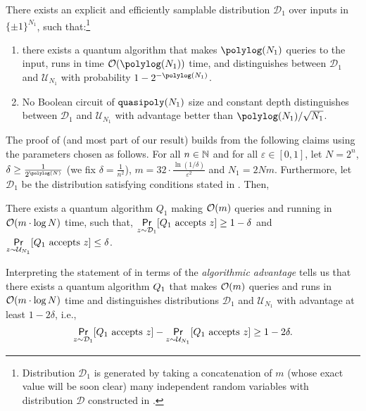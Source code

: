 \documentclass{article}
\begin{document}
\begin{theorem}[{\cite[Theorem~1.2]{RT22}}]
\label{thm:MainRazTalTheorem}
There exists an explicit and efficiently samplable distribution $\mathcal{D}_1$ over inputs in $\{\pm 1 \}^{N_1}$, such that:\footnote{Distribution $\mathcal{D}_1$ is generated by taking a concatenation of $m$ (whose exact value will be soon clear) many independent random variables with
distribution $\mathcal{D}$ constructed in \cite[Section~4]{RT22}.}
\begin{enumerate}
    \item there exists a quantum algorithm that makes $\polylog(N_1)$ queries to the input, runs in time $\bigO(\polylog(N_1))$ time, and distinguishes between $\mathcal{D}_1$ and $\mathcal{U}_{N_1}$ with probability $1-2^{-\polylog(N_1)}$.
    \item No Boolean circuit of $\mathtt{quasipoly}(N_1)$ size and constant depth distinguishes between $\mathcal{D}_1$ and $\mathcal{U}_{N_1}$ with advantage better than $\polylog(N_1)/\sqrt{N_1}$.
\end{enumerate}
\end{theorem}

The proof of  (and most part of our result) builds from the following claims using the parameters chosen as follows. For all $n \in \mathbb{N}$ and for all $\varepsilon \in [0,1]$, let $N=2^n$, $\delta \geq \frac{1}{2^{\polylog(N)}}$ (we fix $\delta=\frac{1}{n^2}$), $m=32 \cdot \frac{\ln(1/{\delta})}{\varepsilon^2}$ and $N_1=2Nm$. Furthermore, let $\mathcal{D}_1$ be the distribution satisfying conditions stated in . Then,

\begin{claim}[{\cite[Claim~8.1]{RT22}}]
\label{thm:QuantumAlgoQ1}
 There exists a quantum algorithm $Q_1$ making $\mathcal{O} (m)$ queries and running in $\mathcal{O}( m \cdot \log N)$ time, such that, $\underset{z \sim \mathcal{D}_1}{\operatorname*{\textsf{Pr}}}[Q_1 \text{ accepts }z] \geq 1-\delta$ and $\underset{z \sim \mathcal{U}_{N_1}}{\operatorname*{\textsf{Pr}}}[Q_1 \text{ accepts }z] \leq \delta$.
\end{claim}
Interpreting the statement of  in terms of the \emph{algorithmic advantage} tells us that there exists a quantum algorithm $Q_1$ that makes $\mathcal{O}(m)$ queries and runs in $\mathcal{O}( m \cdot \log N)$ time and distinguishes distributions $\mathcal{D}_1$ and $\mathcal{U}_{N_1}$ with advantage at least $1-2\delta$, i.e.,
\begin{equation}
\label{eq:QuantumAlgoDistAdvantage}
\underset{z \sim \mathcal{D}_1}{\operatorname*{\textsf{Pr}}}[Q_1 \text{ accepts }z] - \underset{z \sim \mathcal{U}_{N_1}}{\operatorname*{\textsf{Pr}}}[Q_1 \text{ accepts }z]\geq 1-2\delta.   
\end{equation}
\end{document}

